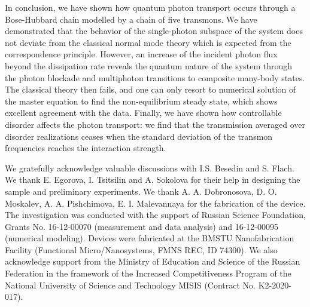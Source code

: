 \documentclass[%
 aps, pra,
 amsmath,amssymb,
 reprint,%
superscriptaddress
]{revtex4-2}
\begin{document}
In conclusion, we have shown how quantum photon transport occurs through a Bose-Hubbard chain modelled by a chain of five transmons. We have demonstrated that the behavior of the single-photon subspace of the system does not deviate from the classical normal mode theory which is expected from the correspondence principle. However, an increase of the incident photon flux beyond the dissipation rate reveals the quantum nature of the system through the photon blockade and multiphoton transitions to composite many-body states. The classical theory then fails, and one can only resort to numerical solution of the master equation to find the non-equilibrium steady state, which shows excellent agreement with the data. Finally, we have shown how controllable disorder affects the photon transport: we find that the transmission averaged over disorder realizations ceases when the standard deviation of the transmon frequencies reaches the interaction strength.

We gratefully acknowledge valuable discussions with I.S. Besedin and S. Flach. We thank E. Egorova, I. Tsitsilin and A. Sokolova for their help in designing the sample and preliminary experiments. We thank  A. A. Dobronosova, D. O. Moskalev, A. A. Pishchimova, E. I. Malevannaya for the fabrication of the device. The investigation was conducted with the support of Russian Science Foundation, Grants No. 16-12-00070 (measurement and data analysis) and 16-12-00095 (numerical modeling). Devices were fabricated at the BMSTU Nanofabrication Facility (Functional Micro/Nanosystems, FMNS REC, ID 74300). We also acknowledge support from the Ministry of Education and Science of the Russian Federation in the framework of the Increased Competitiveness Program of the National University of Science and Technology MISIS (Contract No. K2-2020-017). 


\end{document}
